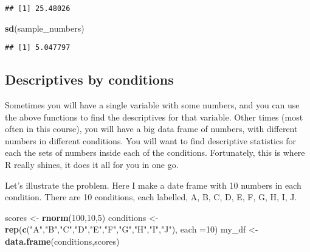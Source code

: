 \documentclass[
]{book}
\newenvironment{Shaded}{\begin{snugshade}}{\end{snugshade}}
\newcommand{\AttributeTok}[1]{\textcolor[rgb]{0.13,0.29,0.53}{#1}}
\newcommand{\DecValTok}[1]{\textcolor[rgb]{0.00,0.00,0.81}{#1}}
\newcommand{\FunctionTok}[1]{\textcolor[rgb]{0.13,0.29,0.53}{\textbf{#1}}}
\newcommand{\NormalTok}[1]{#1}
\newcommand{\OtherTok}[1]{\textcolor[rgb]{0.56,0.35,0.01}{#1}}
\newcommand{\StringTok}[1]{\textcolor[rgb]{0.31,0.60,0.02}{#1}}
\begin{document}
\begin{verbatim}
## [1] 25.48026
\end{verbatim}

\begin{Shaded}
\begin{Highlighting}[]
\FunctionTok{sd}\NormalTok{(sample\_numbers)}
\end{Highlighting}
\end{Shaded}

\begin{verbatim}
## [1] 5.047797
\end{verbatim}

\hypertarget{descriptives-by-conditions}{%
\subsection{Descriptives by conditions}\label{descriptives-by-conditions}}

Sometimes you will have a single variable with some numbers, and you can use the above functions to find the descriptives for that variable. Other times (most often in this course), you will have a big data frame of numbers, with different numbers in different conditions. You will want to find descriptive statistics for each the sets of numbers inside each of the conditions. Fortunately, this is where R really shines, it does it all for you in one go.

Let's illustrate the problem. Here I make a date frame with 10 numbers in each condition. There are 10 conditions, each labelled, A, B, C, D, E, F, G, H, I, J.

\begin{Shaded}
\begin{Highlighting}[]
\NormalTok{scores }\OtherTok{\textless{}{-}} \FunctionTok{rnorm}\NormalTok{(}\DecValTok{100}\NormalTok{,}\DecValTok{10}\NormalTok{,}\DecValTok{5}\NormalTok{)}
\NormalTok{conditions }\OtherTok{\textless{}{-}} \FunctionTok{rep}\NormalTok{(}\FunctionTok{c}\NormalTok{(}\StringTok{"A"}\NormalTok{,}\StringTok{"B"}\NormalTok{,}\StringTok{"C"}\NormalTok{,}\StringTok{"D"}\NormalTok{,}\StringTok{"E"}\NormalTok{,}\StringTok{"F"}\NormalTok{,}\StringTok{"G"}\NormalTok{,}\StringTok{"H"}\NormalTok{,}\StringTok{"I"}\NormalTok{,}\StringTok{"J"}\NormalTok{), }\AttributeTok{each =}\DecValTok{10}\NormalTok{)}
\NormalTok{my\_df }\OtherTok{\textless{}{-}} \FunctionTok{data.frame}\NormalTok{(conditions,scores)}
\end{Highlighting}
\end{Shaded}
\end{document}
